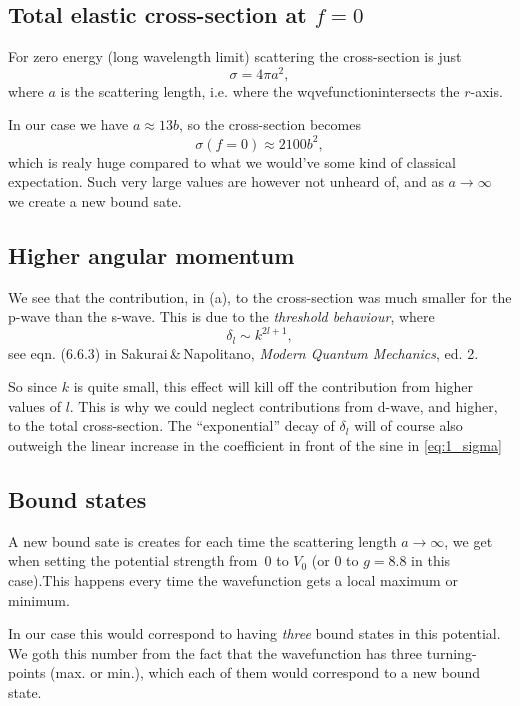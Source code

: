 \documentclass[11pt,letter, swedish, english
]{article}
\begin{document}
\subsection{Total elastic cross-section at $f=0$}
For zero energy (long wavelength limit) scattering the cross-section
is just
\begin{equation}
\sigma=4\pi a^2,
\end{equation}
where $a$ is the scattering length, i.e. where the
wqvefunctionintersects the $r$-axis. 

In our case we have $a\approx 13b$, so the cross-section becomes
\begin{equation}
\sigma(f{=}0) \approx 2100b^2,
\end{equation}
which is realy huge compared to what we would've some kind of
classical expectation. Such very large values are however not unheard
of, and as $a\to\infty$ we create a new bound sate.

\subsection{Higher angular momentum}
We see that the contribution, in (a), to the cross-section was much
smaller for the p-wave than the s-wave. This is due to the
\emph{threshold behaviour}, where
\begin{equation}
\delta_l\sim k^{2l+1},
\end{equation}
see eqn. (6.6.3) in Sakurai\,\&\,Napolitano, \textit{Modern
  Quantum Mechanics}, ed. 2. 

So since $k$ is quite small, this effect will kill off the
contribution from higher values of $l$. This is why we could neglect
contributions from d-wave, and higher, to the total cross-section. The
``exponential'' decay of $\delta_l$ will of course also outweigh the
linear increase in the coefficient in front of the sine in
\eqref{eq:1_sigma} 


\subsection{Bound states}
A new bound sate is creates for each time the scattering length
$a\to\infty$, we get when setting the potential strength from~0 to
$V_0$ (or 0 to $g=8.8$ in this case).This happens every time the
wavefunction gets a local maximum or minimum. 

In our case this would correspond to having \emph{three} bound states
in this potential. We goth this number from the fact that the
wavefunction has three turning-points (max. or min.), which each of
them would correspond to a new bound state.
\end{document}
